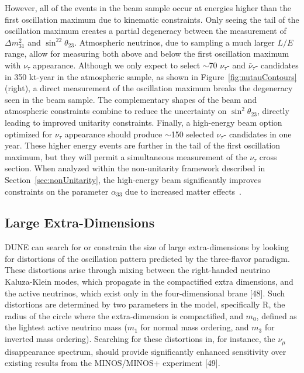 However, all of the events in the beam sample occur at energies higher than the first oscillation maximum due to kinematic constraints.  Only seeing the tail of the oscillation maximum creates a partial degeneracy between the measurement of $\Delta m^2_{31}$ and $\sin^22\theta_{23}$.  Atmospheric neutrinos, due to sampling a much larger $L/E$ range, allow for measuring both above and below the first oscillation maximum with $\nu_{\tau}$ appearance.  Although we only expect to select $\sim$70 $\nu_{\tau}$- and $\bar{\nu}_{\tau}$- candidates in 350 kt-year in the atmospheric sample, as shown in Figure~\ref{fig:nutauContours} (right), a direct measurement of the oscillation maximum breaks the degeneracy seen in the beam sample. The complementary shapes of the beam and atmospheric constraints combine to reduce the uncertainty on $\sin^2\theta_{23}$, directly leading to improved unitarity constraints.  Finally, a high-energy beam option optimized for $\nu_{\tau}$ appearance should produce $\sim$150 selected  $\nu_{\tau}$- candidates in one year.  These higher energy events are further in the tail of the first oscillation maximum, but they will permit a simultaneous measurement of the $\nu_{\tau}$ cross section.  When analyzed within the non-unitarity framework described in Section~\ref{sec:nonUnitarity}, the high-energy beam significantly improves constraints on the parameter $\alpha_{33}$ due to increased matter effects~\cite{deGouvea:2019ozk}.

\subsection{Large Extra-Dimensions}
DUNE can search for or constrain the size of large extra-dimensions %
by looking for distortions of the oscillation pattern predicted by the three-flavor paradigm. These distortions arise through mixing between the right-handed neutrino Kaluza-Klein modes, which propagate in the compactified extra dimensions, and the active neutrinos, which exist only in the four-dimensional brane [48]. Such distortions are determined by two parameters in the model, specifically R, the radius of the circle where the extra-dimension is compactified, and $m_0$, defined as the lightest active neutrino mass ($m_1$ for normal mass ordering, and $m_3$ for inverted mass ordering). Searching for these distortions in, for instance, the $\nu_\mu$~ disappearance spectrum, should provide significantly enhanced sensitivity over existing results from the MINOS/MINOS+ experiment [49].

